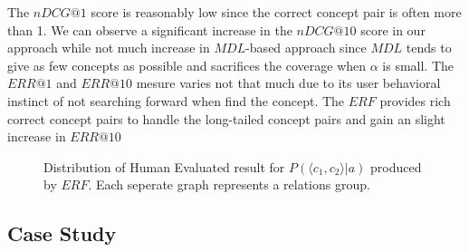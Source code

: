 The $nDCG@1$ score is reasonably low since the correct concept pair is often more than 1.
We can observe a significant increase in the $nDCG@10$ score in our approach while not much increase in $MDL$-based approach since $MDL$ tends to give as few concepts as possible and sacrifices the coverage when $\alpha$ is small.
The $ERR@1$ and $ERR@10$ mesure varies not that much due to its user behavioral instinct of not searching forward when find the concept.
The $ERF$ provides rich correct concept pairs to handle the long-tailed concept pairs and gain an slight increase in $ERR@10$

\begin{figure*}[!htb]
\centering
{}
\caption{Distribution of Human Evaluated result for $P(\langle c_1,c_2 \rangle|a)$ produced by $ERF$. \small Each seperate graph represents a relations group.}
\label{fig:eva_violin_group}
\end{figure*}



\subsection{Case Study}

